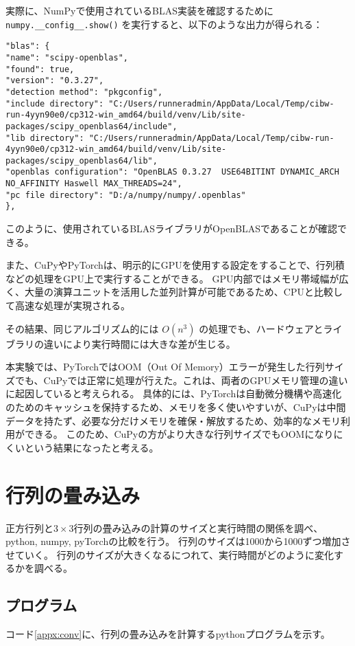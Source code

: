 \documentclass{ltjsarticle}
\begin{document}
    実際に、NumPyで使用されているBLAS実装を確認するために \verb|numpy.__config__.show()| を実行すると、以下のような出力が得られる：

    \begin{lstlisting}
"blas": {
"name": "scipy-openblas",
"found": true,
"version": "0.3.27",
"detection method": "pkgconfig",
"include directory": "C:/Users/runneradmin/AppData/Local/Temp/cibw-run-4yyn90e0/cp312-win_amd64/build/venv/Lib/site-packages/scipy_openblas64/include",
"lib directory": "C:/Users/runneradmin/AppData/Local/Temp/cibw-run-4yyn90e0/cp312-win_amd64/build/venv/Lib/site-packages/scipy_openblas64/lib",
"openblas configuration": "OpenBLAS 0.3.27  USE64BITINT DYNAMIC_ARCH NO_AFFINITY Haswell MAX_THREADS=24",
"pc file directory": "D:/a/numpy/numpy/.openblas"
},
    \end{lstlisting}

    このように、使用されているBLASライブラリがOpenBLASであることが確認できる。

    また、CuPyやPyTorchは、明示的にGPUを使用する設定をすることで、行列積などの処理をGPU上で実行することができる。
    GPU内部ではメモリ帯域幅が広く、大量の演算ユニットを活用した並列計算が可能であるため、CPUと比較して高速な処理が実現される。

    その結果、同じアルゴリズム的には \(O(n^3)\) の処理でも、ハードウェアとライブラリの違いにより実行時間には大きな差が生じる。

    本実験では、PyTorchではOOM（Out Of Memory）エラーが発生した行列サイズでも、CuPyでは正常に処理が行えた。これは、両者のGPUメモリ管理の違いに起因していると考えられる。
    具体的には、PyTorchは自動微分機構や高速化のためのキャッシュを保持するため、メモリを多く使いやすいが、CuPyは中間データを持たず、必要な分だけメモリを確保・解放するため、効率的なメモリ利用ができる。
    このため、CuPyの方がより大きな行列サイズでもOOMになりにくいという結果になったと考える。


\section{行列の畳み込み}
    正方行列と\(3\times3\)行列の畳み込みの計算のサイズと実行時間の関係を調べ、
    python, numpy, pyTorchの比較を行う。
    行列のサイズは1000から1000ずつ増加させていく。
    行列のサイズが大きくなるにつれて、実行時間がどのように変化するかを調べる。

    \subsection{プログラム}
    コード\ref{appx:conv}に、行列の畳み込みを計算するpythonプログラムを示す。
\end{document}
